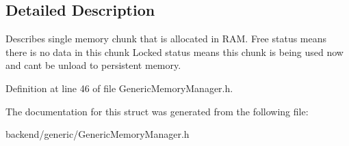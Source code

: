 \subsection{Detailed Description}
Describes single memory chunk that is allocated in R\+AM. Free status means there is no data in this chunk Locked status means this chunk is being used now and can\textquotesingle{}t be unload to persistent memory. 

Definition at line 46 of file Generic\+Memory\+Manager.\+h.



The documentation for this struct was generated from the following file\+:\begin{DoxyCompactItemize}
\item 
backend/generic/Generic\+Memory\+Manager.\+h\end{DoxyCompactItemize}
